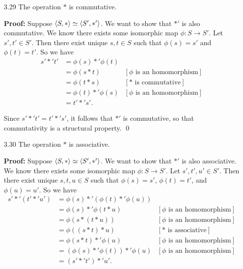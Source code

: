 \begin{enumerate}
   \item[3.29] The operation $*$ is commutative.

      \textbf{Proof:} Suppose $\langle S, * \rangle \simeq \langle S', *' \rangle$. We want to show
      that $*'$ is also commutative. We know there exists some isomorphic
      map $\phi : S \rightarrow S'$. Let $s', t' \in S'$. Then there exist
      unique $s, t \in S$ such that $\phi(s) = s'$ and $\phi(t) = t'$. So
      we have \begin{align*}
         s' *' t' &= \phi(s) *' \phi(t) \\ 
                  &= \phi(s * t) &[\phi\text{ is an homomorphism}] \\
                  &= \phi(t * s) &[* \text{ is commutative}] \\
                  &= \phi(t) *' \phi(s) &[\phi \text{ is an homomorphism}] \\
                  &= t' *' s'.
      \end{align*}

      Since $s' *' t' = t' *' s'$, it follows that $*'$ is commutative, so that
      commutativity is a structural property. \qed
   \item[3.30] The operation $*$ is associative.

      \textbf{Proof:} Suppose $\langle S, * \rangle \simeq \langle S', *' \rangle$. We want to show
      that $*'$ is also associative. We know there exists some isomorphic
      map $\phi : S \rightarrow S'$. Let $s', t', u' \in S'$. Then there exist
      unique $s, t, u \in S$ such that $\phi(s) = s'$, $\phi(t) = t'$, and
      $\phi(u) = u'$. So
      we have \begin{align*}
         s' *' (t' *' u') &= \phi(s) *' (\phi(t) *' \phi(u)) \\ 
                  &= \phi(s) *' \phi(t * u) &[\phi\text{ is an homomorphism}] \\
                  &= \phi(s * (t * u)) &[\phi\text{ is an homomorphism}] \\
                  &= \phi((s * t) * u) &[*\text{ is associative}] \\
                  &= \phi(s * t) *' \phi(u) &[\phi\text{ is an homomorphism}] \\
                  &= (\phi(s) *' \phi(t)) *' \phi(u)
                     &[\phi\text{ is an homomorphism}] \\
                  &= (s' *' t') *' u'.
      \end{align*}


\end{enumerate}

